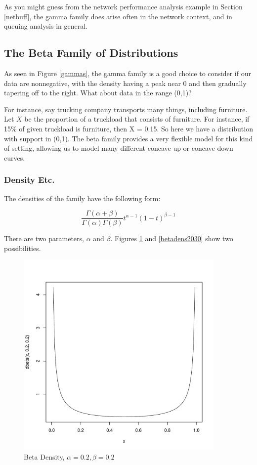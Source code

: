 As you might guess from the network performance analysis example in
Section \ref{netbuff}, the gamma family does arise often in the network
context, and in queuing analysis in general.

\subsection{The Beta Family of Distributions}
\label{betafamily}

As seen in Figure \ref{gammas}, the gamma family is a good choice to
consider if our data are nonnegative, with the density having
a peak near 0 and then gradually tapering off to the right.  What about
data in the range (0,1)?  

For instance, say trucking company transports many things, including
furniture.  Let $X$ be the proportion of a truckload that consists of
furniture.  For instance, if 15\% of given truckload is furniture, then
X = 0.15.  So here we have a distribution with support in (0,1).  The
beta family provides a very flexible model for this kind of setting,
allowing us to model many different concave up or concave down curves.

\subsubsection{Density Etc.}

The densities of the family have the following form:

\begin{equation}
\frac{\Gamma(\alpha+\beta)}{\Gamma(\alpha) \Gamma(\beta)}
t^{\alpha-1}(1-t)^{\beta-1}
\end{equation}

There are two parameters, $\alpha$ and $\beta$.  
Figures \ref{betadens0202}
and \ref{betadens2030}
show two possibilities.

\begin{figure}
\centerline{
\includegraphics[width=4in]{Beta0202.pdf}
}
\caption{Beta Density, $\alpha = 0.2, \beta = 0.2$}
\label{betadens0202}
\end{figure}

